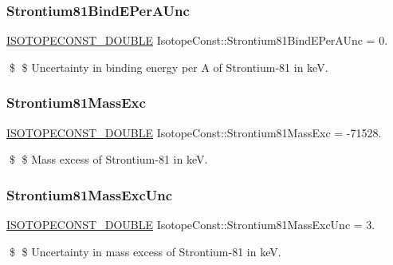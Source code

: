 \subsubsection{\texorpdfstring{Strontium81\+Bind\+E\+Per\+A\+Unc}{Strontium81BindEPerAUnc}}
{\footnotesize\ttfamily \mbox{\hyperlink{group___isotope_const-_macros_ga8f45a7272ce02c0b4c65c44636ed719a}{I\+S\+O\+T\+O\+P\+E\+C\+O\+N\+S\+T\+\_\+\+D\+O\+U\+B\+LE}} Isotope\+Const\+::\+Strontium81\+Bind\+E\+Per\+A\+Unc = 0.}

\$ \$ Uncertainty in binding energy per A of Strontium-\/81 in keV. \mbox{\label{group___isotope_const-_strontium-_sr81_gafc3232b66f927387e0c5ea9141ff29e7}} 
\subsubsection{\texorpdfstring{Strontium81\+Mass\+Exc}{Strontium81MassExc}}
{\footnotesize\ttfamily \mbox{\hyperlink{group___isotope_const-_macros_ga8f45a7272ce02c0b4c65c44636ed719a}{I\+S\+O\+T\+O\+P\+E\+C\+O\+N\+S\+T\+\_\+\+D\+O\+U\+B\+LE}} Isotope\+Const\+::\+Strontium81\+Mass\+Exc = -\/71528.}

\$ \$ Mass excess of Strontium-\/81 in keV. \mbox{\label{group___isotope_const-_strontium-_sr81_ga629a02fffe6b37d61f01d20bea6eeaf2}} 
\subsubsection{\texorpdfstring{Strontium81\+Mass\+Exc\+Unc}{Strontium81MassExcUnc}}
{\footnotesize\ttfamily \mbox{\hyperlink{group___isotope_const-_macros_ga8f45a7272ce02c0b4c65c44636ed719a}{I\+S\+O\+T\+O\+P\+E\+C\+O\+N\+S\+T\+\_\+\+D\+O\+U\+B\+LE}} Isotope\+Const\+::\+Strontium81\+Mass\+Exc\+Unc = 3.}

\$ \$ Uncertainty in mass excess of Strontium-\/81 in keV. \mbox{\label{group___isotope_const-_strontium-_sr81_gaf9c48d3c193ea4bbdc4b717c98544117}} 
